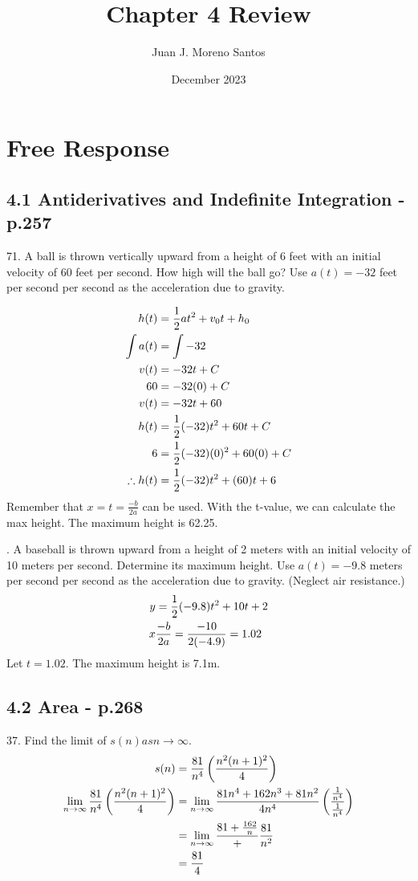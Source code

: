 \documentclass[11pt]{article}
\newcommand*{\vs}{\vspace{1cm}}
\newcommand*{\next}{\noindent}
\newcommand*{\set}{\setcounter{equation}{0}}
\newcommand*{\lt}{\left}
\newcommand*{\rt}{\right}
\begin{document}
\title{Chapter 4 Review}
\author{Juan J. Moreno Santos}
\date{December 2023}

\maketitle

\section{Free Response}
\subsection{4.1 Antiderivatives and Indefinite Integration - p.257}
71. A ball is thrown vertically upward from a height of 6 feet with an
initial velocity of 60 feet per second. How high will the ball go? Use $a(t)=-32$ feet per
second per second as the acceleration due to gravity. 

\begin{align}
    \set
    h(t)&=\frac{1}{2}at^2+v_0t+h_0\\
    \int a(t)&=\int -32\\
    v(t)&=-32t+C\\
    60&=-32(0)+C\\
    v(t)&=-32t+60\\
    h(t)&=\frac{1}{2}(-32)t^2+60t+C\\
    6&=\frac{1}{2}(-32)(0)^2+60(0)+C\\
    \therefore h(t)&=\frac{1}{2}(-32)t^2+(60)t+6
\end{align}
Remember that $x=t=\frac{-b}{2a}$ can be used. With the t-value, we can calculate the max height.
The maximum height is 62.25.

\vs\next
77. A baseball is thrown upward from a height of 2 meters with
an initial velocity of 10 meters per second. Determine its
maximum height. Use $a(t)=-9.8$ meters
per second per second as the acceleration due to gravity.
(Neglect air resistance.)
\begin{align}
    \set
    y&=\frac{1}{2}(-9.8)t^2+10t+2\\
    x&\frac{-b}{2a}=\frac{-10}{2(-4.9)}=1.02
\end{align}
Let $t=1.02$. The maximum height is 7.1m.

\subsection{4.2 Area - p.268}
37. Find the limit of $s(n) as n\to\infty$.
\begin{align}
    \set
    s(n)&=\frac{81}{n^4}\lt(\frac{n^2(n+1)^2}{4}\rt)\\
    \lim_{n\to\infty}\frac{81}{n^4}\lt(\frac{n^2(n+1)^2}{4}\rt)&=\lim_{n\to\infty}\frac{81n^4+162n^3+81n^2}{4n^4}\lt(\frac{\frac{1}{n^4}}{\frac{1}{n^4}}\rt)\\
    &=\lim_{n\to\infty}\frac{81+\frac{162}{n}}+\frac{81}{n^2}\\
    &=\frac{81}{4}
\end{align}
\end{document}

